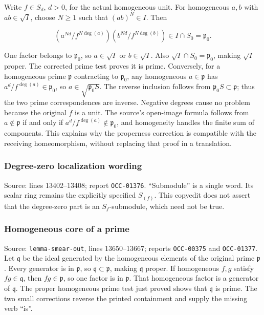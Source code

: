 Write \(f\in S_d\), \(d>0\), for the actual homogeneous unit. For homogeneous \(a,b\) with \(ab\in\sqrt I\), choose \(N\geq1\) such that \((ab)^N\in I\). Then

\[
\left(a^{Nd}/f^{N\deg(a)}\right)
\left(b^{Nd}/f^{N\deg(b)}\right)\in I\cap S_0=\mathfrak p_0.
\]

One factor belongs to \(\mathfrak p_0\), so \(a\in\sqrt I\) or \(b\in\sqrt I\). Also \(\sqrt I\cap S_0=\mathfrak p_0\), making \(\sqrt I\) proper. The corrected prime test proves it is prime. Conversely, for a homogeneous prime \(\mathfrak p\) contracting to \(\mathfrak p_0\), any homogeneous \(a\in\mathfrak p\) has \(a^d/f^{\deg(a)}\in\mathfrak p_0\), so \(a\in\sqrt{\mathfrak p_0S}\). The reverse inclusion follows from \(\mathfrak p_0S\subset\mathfrak p\); thus the two prime correspondences are inverse. Negative degrees cause no problem because the original \(f\) is a unit. The source's open-image formula follows from \(a\notin\mathfrak p\) if and only if \(a^d/f^{\deg(a)}\notin\mathfrak p_0\), and homogeneity handles the finite sum of components. This explains why the properness correction is compatible with the receiving homeomorphism, without replacing that proof in a translation.

\subsubsection{Degree-zero localization wording}\label{algebra-proof-002-degree-zero-localization-wording}

Source: lines 13402--13408; report \texttt{OCC-01376}. ``Submodule'' is a single word. Its scalar ring remains the explicitly specified \(S_{(f)}\). This copyedit does not assert that the degree-zero part is an \(S_f\)-submodule, which need not be true.

\subsubsection{Homogeneous core of a prime}\label{algebra-proof-002-homogeneous-core-of-a-prime}

Source: \texttt{lemma-\AlgebraIdentifierBreak{}smear-\AlgebraIdentifierBreak{}out}, lines 13650--13667; reports \texttt{OCC-00375} and \texttt{OCC-01377}. Let \(\mathfrak q\) be the ideal generated by the homogeneous elements of the original prime \(\mathfrak p\). Every generator is in \(\mathfrak p\), so \(\mathfrak q\subset\mathfrak p\), making \(\mathfrak q\) proper. If homogeneous \(f,g\) satisfy \(fg\in\mathfrak q\), then \(fg\in\mathfrak p\), so one factor is in \(\mathfrak p\). That homogeneous factor is a generator of \(\mathfrak q\). The proper homogeneous prime test just proved shows that \(\mathfrak q\) is prime. The two small corrections reverse the printed containment and supply the missing verb ``is''.

